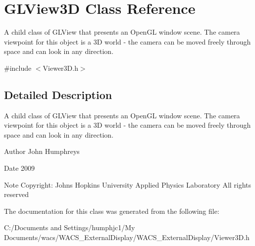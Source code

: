 \hypertarget{class_g_l_view3_d}{
\section{GLView3D Class Reference}
\label{class_g_l_view3_d}
}


A child class of GLView that presents an OpenGL window scene. The camera viewpoint for this object is a 3D world -\/ the camera can be moved freely through space and can look in any direction.  




{\ttfamily \#include $<$Viewer3D.h$>$}



\subsection{Detailed Description}
A child class of GLView that presents an OpenGL window scene. The camera viewpoint for this object is a 3D world -\/ the camera can be moved freely through space and can look in any direction. 

\begin{DoxyAuthor}{Author}
John Humphreys 
\end{DoxyAuthor}
\begin{DoxyDate}{Date}
2009 
\end{DoxyDate}
\begin{DoxyNote}{Note}
Copyright: Johns Hopkins University Applied Physics Laboratory All rights reserved 
\end{DoxyNote}


The documentation for this class was generated from the following file:\begin{DoxyCompactItemize}
\item 
C:/Documents and Settings/humphjc1/My Documents/wacs/WACS\_\-ExternalDisplay/WACS\_\-ExternalDisplay/Viewer3D.h\end{DoxyCompactItemize}
